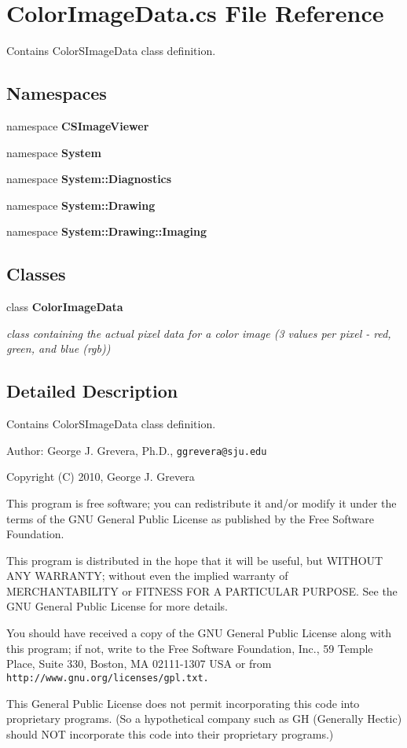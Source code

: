 \section{Color\-Image\-Data.cs File Reference}
\label{_color_image_data_8cs}
Contains Color\-SImage\-Data class definition. 

\subsection*{Namespaces}
\begin{CompactItemize}
\item 
namespace {\bf CSImage\-Viewer}
\item 
namespace {\bf System}
\item 
namespace {\bf System::Diagnostics}
\item 
namespace {\bf System::Drawing}
\item 
namespace {\bf System::Drawing::Imaging}
\end{CompactItemize}
\subsection*{Classes}
\begin{CompactItemize}
\item 
class {\bf Color\-Image\-Data}
\begin{CompactList}\small\item\em class containing the actual pixel data for a color image (3 values per pixel - red, green, and blue (rgb)) \item\end{CompactList}\end{CompactItemize}


\subsection{Detailed Description}
Contains Color\-SImage\-Data class definition. 

\begin{Desc}
\item[Author:]George J. Grevera, Ph.D., {\tt ggrevera@sju.edu}\end{Desc}
Copyright (C) 2010, George J. Grevera

This program is free software; you can redistribute it and/or modify it under the terms of the GNU General Public License as published by the Free Software Foundation.

This program is distributed in the hope that it will be useful, but WITHOUT ANY WARRANTY; without even the implied warranty of MERCHANTABILITY or FITNESS FOR A PARTICULAR PURPOSE. See the GNU General Public License for more details.

You should have received a copy of the GNU General Public License along with this program; if not, write to the Free Software Foundation, Inc., 59 Temple Place, Suite 330, Boston, MA 02111-1307 USA or from {\tt http://www.gnu.org/licenses/gpl.txt.}

This General Public License does not permit incorporating this code into proprietary programs. (So a hypothetical company such as GH (Generally Hectic) should NOT incorporate this code into their proprietary programs.) 